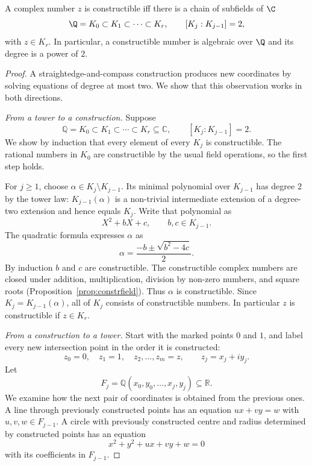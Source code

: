 \begin{theorem}[Wantzel]\label{thm:wantzel}
A complex number $z$ is constructible iff there is a chain of subfields of $\C$
\[
\Q=K_0\subset K_1\subset\dots\subset K_r,\qquad[K_j:K_{j-1}]=2,
\]
with $z\in K_r$. In particular, a constructible number is algebraic over $\Q$ and its degree is a power of $2$.
\end{theorem}
\begin{proof}
A straightedge-and-compass construction produces new coordinates by
solving equations of degree at most two. We show that this observation
works in both directions.

\emph{From a tower to a construction.}
Suppose
\[
\mathbb Q=K_0\subset K_1\subset\cdots\subset K_r\subseteq\mathbb C,
\qquad [K_j:K_{j-1}]=2.
\]
We show by induction that every element of every $K_j$ is
constructible. The rational numbers in $K_0$ are constructible by
the usual field operations, so the first step holds.

For $j\ge1$, choose $\alpha\in K_j\setminus K_{j-1}$.
Its minimal polynomial over $K_{j-1}$ has degree $2$ by the tower law:
$K_{j-1}(\alpha)$ is a non-trivial intermediate extension of a
degree-two extension and hence equals $K_j$. Write that polynomial as
\[
X^2+bX+c,\qquad b,c\in K_{j-1}.
\]
The quadratic formula expresses $\alpha$ as
\[
\alpha=\frac{-b\pm\sqrt{b^2-4c}}2.
\]
By induction $b$ and $c$ are constructible. The constructible
complex numbers are closed under addition, multiplication, division
by non-zero numbers, and square roots (Proposition~\ref{prop:constrfield}).
Thus $\alpha$ is constructible. Since $K_j=K_{j-1}(\alpha)$,
all of $K_j$ consists of constructible numbers. In particular $z$
is constructible if $z\in K_r$.

\emph{From a construction to a tower.}
Start with the marked points $0$ and $1$, and label every new
intersection point in the order it is constructed:
\[
z_0=0,\quad z_1=1,\quad z_2,\dots,z_m=z,
\qquad z_j=x_j+iy_j.
\]
Let
\[
F_j=\mathbb Q(x_0,y_0,\dots,x_j,y_j)\subseteq\mathbb R.
\]
We examine how the next pair of coordinates is obtained from the
previous ones. A line through previously constructed points has
an equation $ux+vy=w$ with $u,v,w\in F_{j-1}$.
A circle with previously constructed centre and radius determined
by constructed points has an equation
\[
x^2+y^2+ux+vy+w=0
\]
with its coefficients in $F_{j-1}$.


\end{proof}
